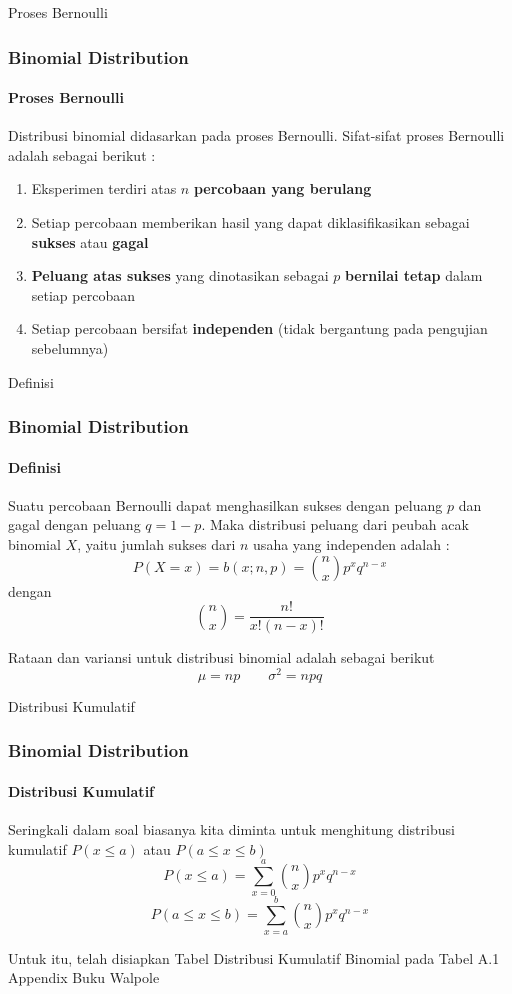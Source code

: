 \documentclass[]{beamer}
\begin{document}
\begin{frame}{Proses Bernoulli}
    \frametitle{Binomial Distribution}
    \framesubtitle{Proses Bernoulli}
    Distribusi binomial didasarkan pada proses Bernoulli. Sifat-sifat proses Bernoulli adalah sebagai berikut :
    \bigskip
    \begin{enumerate}
        \item Eksperimen terdiri atas $n$ \textbf{percobaan yang berulang}
        \item Setiap percobaan memberikan hasil yang dapat diklasifikasikan sebagai \textbf{sukses} atau \textbf{gagal}
        \item \textbf{Peluang atas sukses} yang dinotasikan sebagai $p$ \textbf{bernilai tetap} dalam setiap percobaan
        \item Setiap percobaan bersifat \textbf{independen} (tidak bergantung pada pengujian sebelumnya)  
    \end{enumerate}
   
\end{frame}

\begin{frame}{Definisi}
    \frametitle{Binomial Distribution}
    \framesubtitle{Definisi}
    Suatu percobaan Bernoulli dapat menghasilkan sukses dengan peluang $p$ dan gagal dengan peluang $q = 1-p$. Maka distribusi peluang dari peubah acak binomial $X$, yaitu jumlah sukses dari $n$ usaha yang independen adalah :
    \bigskip
    \begin{equation*}
        P(X=x) = b(x; n, p) = \binom{n}{x} p^x q^{n-x}
    \end{equation*}
   \bigskip
   dengan 
   \bigskip
   \begin{equation*}
       \binom{n}{x} = \frac{n!}{x!(n-x)!}
   \end{equation*}
   \bigskip
   
   Rataan dan variansi untuk distribusi binomial adalah sebagai berikut
    \begin{equation*}
        \mu = np \qquad \sigma^2 = npq
    \end{equation*}
\end{frame}

\begin{frame}{Distribusi Kumulatif}
    \frametitle{Binomial Distribution}
    \framesubtitle{Distribusi Kumulatif}
    Seringkali dalam soal biasanya kita diminta untuk menghitung distribusi kumulatif $P(x\le a) $ atau $P(a\le x\le b) $
    \bigskip
    \begin{equation*}
        P(x \le a) = \sum_{x=0}^a \binom{n}{x} p^x q^{n-x}
    \end{equation*}
    \begin{equation*}
        P(a \le x \le b) = \sum_{x=a}^b \binom{n}{x} p^x q^{n-x}
    \end{equation*}
    \bigskip
    
    Untuk itu, telah disiapkan Tabel Distribusi Kumulatif Binomial pada Tabel A.1 Appendix Buku Walpole
\end{frame}
\end{document}
